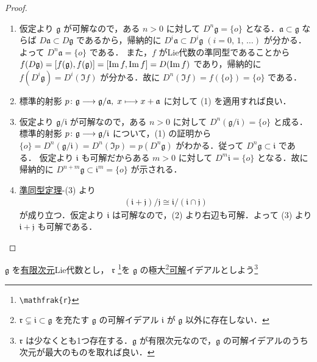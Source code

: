 \documentclass[rep_main]{subfiles}
\begin{document}
\begin{proof}
    \begin{enumerate}
        \item 仮定より $\mathfrak{g}$ が可解なので，ある $n > 0$ に対して $D^n \mathfrak{g} = \{o\}$ となる．$\mathfrak{a} \subset \mathfrak{g}$ ならば $D \mathfrak{a} \subset D \mathfrak{g}$ であるから，帰納的に $D^i \mathfrak{a} \subset D^i \mathfrak{g}\; (i = 0,\, 1,\, \dots)$ が分かる．よって $D^n \mathfrak{a} = \{o\}$ である．
        また，$f$ がLie代数の準同型であることから $f(D \mathfrak{g}) = \comm{f(\mathfrak{g})}{f(\mathfrak{g})} = \comm{\Im f}{\Im f} = D(\Im f)$ であり，帰納的に $f(D^i \mathfrak{g}) = D^i(\Im f)$ が分かる．故に $D^n (\Im f) = f(\{o\}) = \{o\}$ である．
        \item 標準的射影 $p \colon \mathfrak{g} \longrightarrow \mathfrak{g}/\mathfrak{a},\; x \longmapsto x + \mathfrak{a}$ に対して (1) を適用すれば良い．
        \item 仮定より $\mathfrak{g} / \mathfrak{i}$ が可解なので，ある $n > 0$ に対して $D^n (\mathfrak{g}/\mathfrak{i}) = \{o\}$ と成る．標準的射影 $p \colon \mathfrak{g} \longrightarrow \mathfrak{g}/\mathfrak{i}$ について，(1) の証明から $\{o\} = D^n (\mathfrak{g}/\mathfrak{i}) = D^n (\Im p) = p (D^n \mathfrak{g})$ がわかる．従って $D^n \mathfrak{g} \subset \mathfrak{i}$ である．
        仮定より $\mathfrak{i}$ も可解だからある $m > 0$ に対して $D^m\mathfrak{i} = \{o\}$ となる．故に帰納的に $D^{n+m} \mathfrak{g} \subset \mathfrak{i}^m = \{o\}$ が示される．
        \item \hyperref[prop:homo]{準同型定理}-(3) より
        \begin{align}
            (\mathfrak{i} + \mathfrak{j})/\mathfrak{j} \cong \mathfrak{i}/(\mathfrak{i} \cap \mathfrak{j})
        \end{align}
        が成り立つ．仮定より $\mathfrak{i}$ は可解なので，(2) より右辺も可解．よって (3) より $\mathfrak{i} + \mathfrak{j}$ も可解である．
    \end{enumerate}
\end{proof}

$\mathfrak{g}$ を\underline{有限次元}Lie代数とし，
$\mathfrak{r}$ \footnote{\texttt{\textbackslash mathfrak\{r\}}}を $\mathfrak{g}$ の極大\footnote{$\mathfrak{r} \subsetneq \mathfrak{i} \subset \mathfrak{g}$ を充たす $\mathfrak{g}$ の可解イデアル $\mathfrak{i}$ が $\mathfrak{g}$ 以外に存在しない．}\hyperref[def:solvable-LieAlg]{可解}イデアルとしよう\footnote{$\mathfrak{r}$ は少なくとも1つ存在する．$\mathfrak{g}$ が有限次元なので，$\mathfrak{g}$ の可解イデアルのうち次元が最大のものを取れば良い．}
\end{document}
